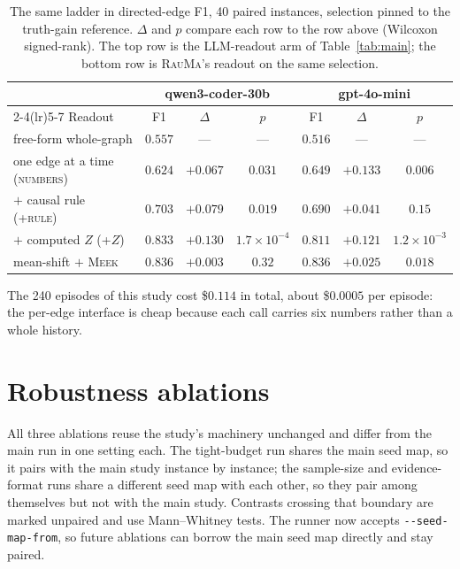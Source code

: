 \documentclass{article}
\newcommand{\rauma}{\textsc{RauMa}}
\newcommand{\meek}{\textsc{Meek}}
\begin{document}
\begin{table}[h]
\caption{The same ladder in directed-edge F1, 40 paired instances, selection pinned to the
truth-gain reference. $\Delta$ and $p$ compare each row to the row above (Wilcoxon
signed-rank). The top row is the LLM-readout arm of Table~\ref{tab:main}; the bottom row is
\rauma{}'s readout on the same selection.}
\label{tab:ladder_f1}
\centering
\small
\setlength{\tabcolsep}{5pt}
\begin{tabular}{lcccccc}
\toprule
& \multicolumn{3}{c}{qwen3-coder-30b} & \multicolumn{3}{c}{gpt-4o-mini} \\
\cmidrule(lr){2-4}\cmidrule(lr){5-7}
Readout & F1 & $\Delta$ & $p$ & F1 & $\Delta$ & $p$ \\
\midrule
free-form whole-graph & $0.557$ & --- & --- & $0.516$ & --- & --- \\
one edge at a time (\textsc{numbers}) & $0.624$ & $+0.067$ & $0.031$ & $0.649$ & $+0.133$ & $0.006$ \\
\quad $+$ causal rule (\textsc{+rule}) & $0.703$ & $+0.079$ & $0.019$ & $0.690$ & $+0.041$ & $0.15$ \\
\quad $+$ computed $Z$ (\textsc{+$Z$}) & $0.833$ & $+0.130$ & $1.7{\times}10^{-4}$ & $0.811$ & $+0.121$ & $1.2{\times}10^{-3}$ \\
\midrule
mean-shift $+$ \meek{} & $\mathbf{0.836}$ & $+0.003$ & $0.32$ & $\mathbf{0.836}$ & $+0.025$ & $0.018$ \\
\bottomrule
\end{tabular}
\end{table}

The 240 episodes of this study cost \$$0.114$ in total, about \$$0.0005$ per episode: the
per-edge interface is cheap because each call carries six numbers rather than a whole history.

\section{Robustness ablations}
\label{app:robust}

All three ablations reuse the study's machinery unchanged and differ from the main run in one
setting each. The tight-budget run shares the main seed map, so it pairs with the main study
instance by instance; the sample-size and evidence-format runs share a different seed map with
each other, so they pair among themselves but not with the main study. Contrasts crossing that
boundary are marked unpaired and use Mann--Whitney tests. The runner now accepts
\texttt{-\/-seed-map-from}, so future ablations can borrow the main seed map directly and stay
paired.
\end{document}
